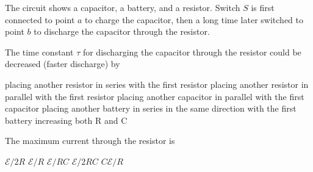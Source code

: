 \documentclass{../../oss-classkick-exam}
\begin{document}
\begin{questions}
{    The circuit shows a capacitor, a battery, and a resistor. Switch $S$ is
    first connected to point $a$ to charge the capacitor, then a long time
    later switched to point $b$ to discharge the capacitor through the
    resistor.
    \begin{center}
    \end{center}
  }

  \question The time constant $\tau$ for discharging the capacitor through the
  resistor could be decreased (faster discharge) by
  \label{switch1}
  \begin{choices}
    \choice placing another resistor in series with the first resistor
    \choice placing another resistor in parallel with the first resistor
    \choice placing another capacitor in parallel with the first capacitor
    \choice placing another battery in series in the same direction with the
    first battery
    \choice increasing both R and C
  \end{choices}
    
  \question The maximum current through the resistor is
  \label{switch2}
  \begin{choices}
    \choice $\mathcal E/2R$
    \choice $\mathcal E/R$
    \choice $\mathcal E/RC$
    \choice $\mathcal E/2RC$
    \choice $C\mathcal E/R$
  \end{choices}

    

\end{questions}
\end{document}
